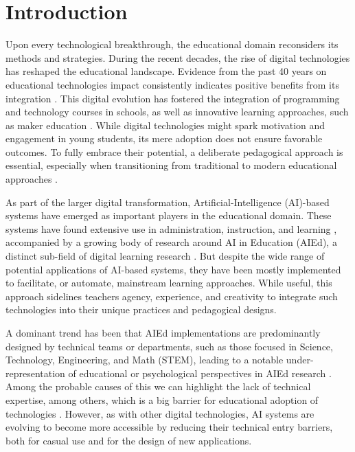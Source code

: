 \documentclass[sn-mathphys, Numbered]{sn-jnl}%
\theoremstyle{thmstyleone}%
\theoremstyle{thmstyletwo}%
\theoremstyle{thmstylethree}%
\begin{document}

\maketitle

\section{Introduction}

Upon every technological breakthrough, the educational domain reconsiders its methods and strategies. During the recent decades, the rise of digital technologies has reshaped the educational landscape. Evidence from the past 40 years on educational technologies impact consistently indicates positive benefits from its integration \parencite{higgins_impact_2012}.  This digital evolution has fostered the integration of programming and technology courses in schools, as well as innovative learning approaches, such as maker education \parencite{blikstein2013digital}. While digital technologies might spark motivation and engagement in young students, its mere adoption does not ensure favorable outcomes.  To fully embrace their potential, a deliberate pedagogical approach is essential, especially when transitioning from traditional to modern educational approaches \parencite{parker_authentic_2020,khaddage_bridging_2021} . 

As part of the larger digital transformation, Artificial-Intelligence (AI)-based systems have emerged as important players in the educational domain. These systems have found extensive use in administration, instruction, and learning \parencite{chen_application_2020}, accompanied by a growing body of research around AI in Education (AIEd), a distinct sub-field of digital learning research \parencite{niemi_ai_2023}.  But despite the wide range of potential applications of AI-based systems, they have been mostly implemented to facilitate, or automate, mainstream learning approaches. While useful, this approach sidelines teachers agency, experience, and creativity to integrate such technologies into their unique practices and pedagogical designs. \parencite{holmes_artificial_2023}

A dominant trend has been that AIEd implementations are predominantly designed by technical teams or departments, such as those focused in Science, Technology, Engineering, and Math (STEM), leading to a notable under-representation of educational or psychological perspectives in AIEd research \parencite{holmes_state_2022, zawacki-richter_systematic_2019}. Among the probable causes of this we can highlight the lack of technical expertise, among others, which is a big barrier for educational adoption of technologies \parencite{reid_categories_2014}. However, as with other digital technologies, AI systems are evolving to become more accessible by reducing their technical entry barriers, both for casual use and for the design of new applications.
\end{document}
